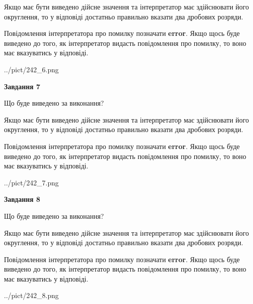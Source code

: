 \documentclass[12pt, ukrainian]{article}
\begin{document}
{\begin {Large}
Якщо має бути виведено дійсне значення та інтерпретатор має здійснювати його округлення, 
то у відповіді достатньо правильно вказати два дробових розряди.

Повідомлення інтерпретатора про помилку позначати \textbf{error}.
Якщо щось буде виведено до того, як інтерпретатор видасть повідомлення про помилку, 
то воно має вказуватись у відповіді. \par

\begin{center}
	{../pict/242_6.png}
\end{center}
\newpage

{\begin {center}\textbf{Завдання 7}\end {center}}\par
Що буде виведено за виконання? \par

Якщо має бути виведено дійсне значення та інтерпретатор має здійснювати його округлення, 
то у відповіді достатньо правильно вказати два дробових розряди.

Повідомлення інтерпретатора про помилку позначати \textbf{error}.
Якщо щось буде виведено до того, як інтерпретатор видасть повідомлення про помилку, 
то воно має вказуватись у відповіді. \par

\begin{center}
	{../pict/242_7.png}
\end{center}
\newpage

{\begin {center}\textbf{Завдання 8}\end {center}}\par
Що буде виведено за виконання? \par

Якщо має бути виведено дійсне значення та інтерпретатор має здійснювати його округлення, 
то у відповіді достатньо правильно вказати два дробових розряди.

Повідомлення інтерпретатора про помилку позначати \textbf{error}.
Якщо щось буде виведено до того, як інтерпретатор видасть повідомлення про помилку, 
то воно має вказуватись у відповіді. \par

\begin{center}
	{../pict/242_8.png}
\end{center}
\newpage


\end{Large}}
\end{document}
